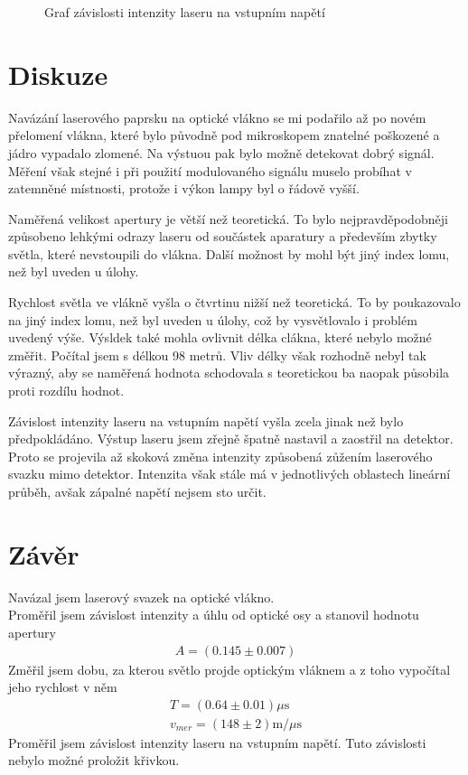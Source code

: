 \documentclass[a4paper,12pt]{article}
\begin{document}
\begin{figure}

\caption{Graf závislosti intenzity laseru na vstupním napětí}
\label{g2}
\end{figure}

\section{Diskuze}
Navázání laserového paprsku na optické vlákno se mi podařilo až po novém přelomení vlákna, které bylo 
původně pod mikroskopem znatelné poškozené a jádro vypadalo zlomené. Na výstuou pak bylo možně 
detekovat dobrý signál. Měření však stejné i při použití modulovaného signálu muselo probíhat v 
zatemněné místnosti, protože i výkon lampy byl o řádově vyšší.

Naměřená velikost apertury je větší než teoretická. To bylo nejpravděpodobněji způsobeno lehkými 
odrazy laseru od součástek aparatury a především zbytky světla, které nevstoupili do vlákna. 
Další možnost by mohl být jiný index lomu, než byl uveden u úlohy.

Rychlost světla ve vlákně vyšla o čtvrtinu nižší než teoretická. To by poukazovalo na jiný index lomu, 
než byl uveden u úlohy, což by vysvětlovalo i problém uvedený výše. Výsldek také mohla ovlivnit délka clákna, 
které nebylo možné změřit. Počítal jsem s délkou 98 metrů. Vliv délky však rozhodně nebyl tak výrazný, aby 
se naměřená hodnota schodovala s teoretickou ba naopak působila proti rozdílu hodnot.

Závislost intenzity laseru na vstupním napětí vyšla zcela jinak než bylo předpokládáno. Výstup laseru jsem 
zřejně špatně nastavil a zaostřil na detektor. Proto se projevila až skoková změna intenzity způsobená zůžením 
laserového svazku mimo detektor. Intenzita však stále má v jednotlivých oblastech lineární průběh, avšak zápalné 
napětí nejsem sto určit.

\section{Závěr}
\noindent
Navázal jsem laserový svazek na optické vlákno. \\
Proměřil jsem závislost intenzity a úhlu od optické osy a stanovil hodnotu apertury
\begin{eqnarray}
A=(0.145 \pm 0.007)
\end{eqnarray}
Změřil jsem dobu, za kterou světlo projde optickým vláknem a z toho vypočítal jeho rychlost v něm
\begin{eqnarray}
T = (0.64 \pm 0.01) \mu \mbox{s} \\
v_{mer}=(148\pm 2) \mbox{m}/\mu\mbox{s}
\end{eqnarray}
Proměřil jsem závislost intenzity laseru na vstupním napětí. Tuto závislosti nebylo možné proložit křivkou.
\end{document}
